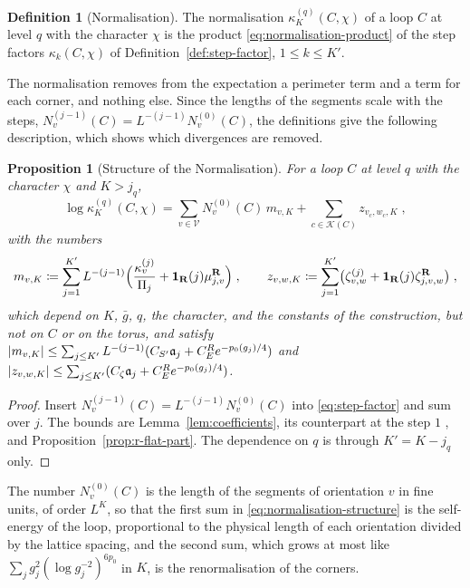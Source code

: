 \documentclass[11pt]{preprint}
\DeclarePairedDelimiter{\abs}{\lvert}{\rvert}
\numberwithin{equation}{section}
\newtheorem{proposition}[theorem]{Proposition}
\theoremstyle{definition}
\newtheorem{definition}[theorem]{Definition}
\theoremstyle{remark}
\theoremstyle{plain}
\begin{document}
\begin{definition}[Normalisation]\label{def:normalisation}
The normalisation $\kappa_K^{(q)}(C, \chi)$ of a loop $C$ at level $q$ with the character $\chi$ is the product \eqref{eq:normalisation-product} of the step factors $\kappa_k(C, \chi)$ of Definition~\ref{def:step-factor}, $1 \leq k \leq K'$.
\end{definition}

The normalisation removes from the expectation a perimeter term and a term for each corner, and nothing else. Since the lengths of the segments scale with the steps, $N^{(j-1)}_v(C) = L^{-(j-1)}N^{(0)}_v(C)$, the definitions give the following description, which shows which divergences are removed.

\begin{proposition}[Structure of the Normalisation]\label{prop:normalisation-structure}
For a loop $C$ at level $q$ with the character $\chi$ and $K > j_q$,
\begin{equation}\label{eq:normalisation-structure}
    \log\kappa^{(q)}_K(C, \chi) = \sum_{v \in \mathcal V}N^{(0)}_v(C)\,m_{v,K} + \sum_{c \in \mathcal K(C)}z_{v_c,w_c,K}\;,
\end{equation}
with the numbers
\begin{equation}\label{eq:mass-and-corner}
    m_{v,K} \coloneqq \sum_{j=1}^{K'}L^{-(j-1)}\Bigl(\frac{\kappa^{(j)}_v}{\Pi_j} + \mathbf 1_{\mathbf R}(j)\mu^{\mathbf R}_{j,v}\Bigr)\;,
    \qquad
    z_{v,w,K} \coloneqq \sum_{j=1}^{K'}\bigl(\zeta^{(j)}_{v,w} + \mathbf 1_{\mathbf R}(j)\zeta^{\mathbf R}_{j,v,w}\bigr)\;,
\end{equation}
which depend on $K$, $\bar g$, $q$, the character, and the constants of the construction, but not on $C$ or on the torus, and satisfy $\abs{m_{v,K}} \leq \sum_{j \leq K'}L^{-(j-1)}(C_{S'}\mathfrak a_j + C^R_Ee^{-p_0(g_j)/4})$ and $\abs{z_{v,w,K}} \leq \sum_{j \leq K'}(C_\zeta\mathfrak a_j + C^R_Ee^{-p_0(g_j)/4})$.
\end{proposition}

\begin{proof}
Insert $N^{(j-1)}_v(C) = L^{-(j-1)}N^{(0)}_v(C)$ into \eqref{eq:step-factor} and sum over $j$. The bounds are Lemma~\ref{lem:coefficients}, its counterpart at the step $1$ \cite[(5.31), (6.5)]{WilsonFirstStep}, and Proposition~\ref{prop:r-flat-part}. The dependence on $q$ is through $K' = K - j_q$ only.
\end{proof}

The number $N^{(0)}_v(C)$ is the length of the segments of orientation $v$ in fine units, of order $L^K$, so that the first sum in \eqref{eq:normalisation-structure} is the self-energy of the loop, proportional to the physical length of each orientation divided by the lattice spacing, and the second sum, which grows at most like $\sum_jg_j^2(\log g_j^{-2})^{6p_0}$ in $K$, is the renormalisation of the corners.
\end{document}
